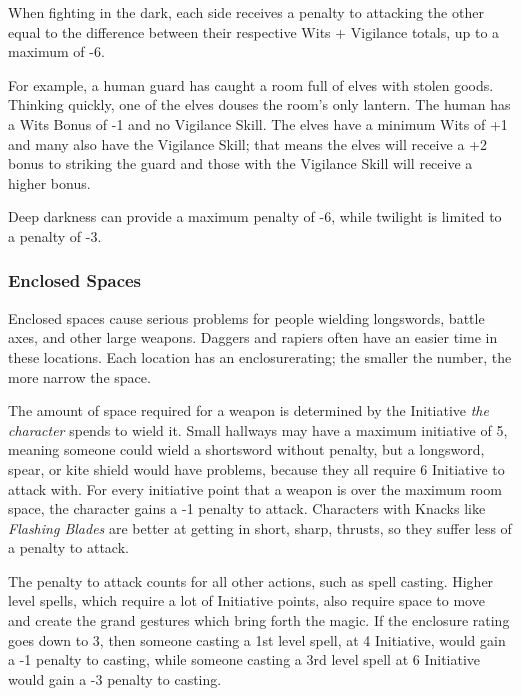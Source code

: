 \begin{multicols}{2}
When fighting in the dark, each side receives a penalty to attacking the other equal to the difference between their respective Wits + Vigilance totals, up to a maximum of -6.

For example, a human guard has caught a room full of elves with stolen goods. Thinking quickly, one of the elves douses the room's only lantern. The human has a Wits Bonus of -1 and no Vigilance Skill. The elves have a minimum Wits of +1 and many also have the Vigilance Skill; that means the elves will receive a +2 bonus to striking the guard and those with the Vigilance Skill will receive a higher bonus.

Deep darkness can provide a maximum penalty of -6, while twilight is limited to a penalty of -3.

\subsubsection[Enclosed Spaces: Penalty equals difference between Initiative cost to attack and Enclosure Rating]{Enclosed Spaces}
\label{enclosedcombat}

Enclosed spaces cause serious problems for people wielding longswords, battle axes, and other large weapons.
Daggers and rapiers often have an easier time in these locations.
Each location has an \gls{enclosurerating}; the smaller the number, the more narrow the space.

The amount of space required for a weapon is determined by the Initiative \textit{the character} spends to wield it.
Small hallways may have a maximum initiative of 5, meaning someone could wield a shortsword without penalty, but a longsword, spear, or kite shield would have problems, because they all require 6 Initiative to attack with.
For every initiative point that a weapon is over the maximum room space, the character gains a -1 penalty to attack.
Characters with Knacks like \textit{Flashing Blades} are better at getting in short, sharp, thrusts, so they suffer less of a penalty to attack.

The penalty to attack counts for all other actions, such as spell casting.
Higher level spells, which require a lot of Initiative points, also require space to move and create the grand gestures which bring forth the magic.
If the enclosure rating goes down to 3, then someone casting a 1st level spell, at 4 Initiative, would gain a -1 penalty to casting, while someone casting a 3rd level spell at 6 Initiative would gain a -3 penalty to casting.


\end{multicols}
